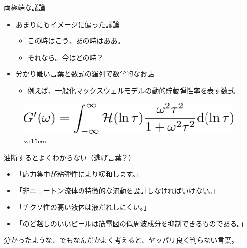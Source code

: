 \begin{frame}

\begin{block}{両極端な議論}

\begin{itemize}

\item
  あまりにもイメージに偏った議論

  \begin{itemize}
  
  \item
    この時はこう、あの時はああ。
  \item
    それなら。今はどの時？
  \end{itemize}
\item
  分かり難い言葉と数式の羅列で数学的なお話

  \begin{itemize}
  
  \item
    例えば、一般化マックスウェルモデルの動的貯蔵弾性率を表す数式
  \end{itemize}
\end{itemize}

\begin{figure}
\centering
\includegraphics{fig/fig_1/ややこしい数式.png}
\caption{w:15cm}
\end{figure}

\end{block}

\end{frame}

\begin{frame}

\begin{block}{油断するとよくわからない（逃げ言葉？）}

\begin{itemize}

\item
  「応力集中が粘弾性により緩和します。」
\item
  「非ニュートン流体の特徴的な流動を設計しなければいけない。」
\item
  「チクソ性の高い液体は液だれしにくい。」
\item
  「のど越しのいいビールは筋電図の低周波成分を抑制できるものである。」
\end{itemize}

{分かったような、でもなんだかよく考えると、ヤッパリ良く判らない言葉。}

\end{block}

\end{frame}

